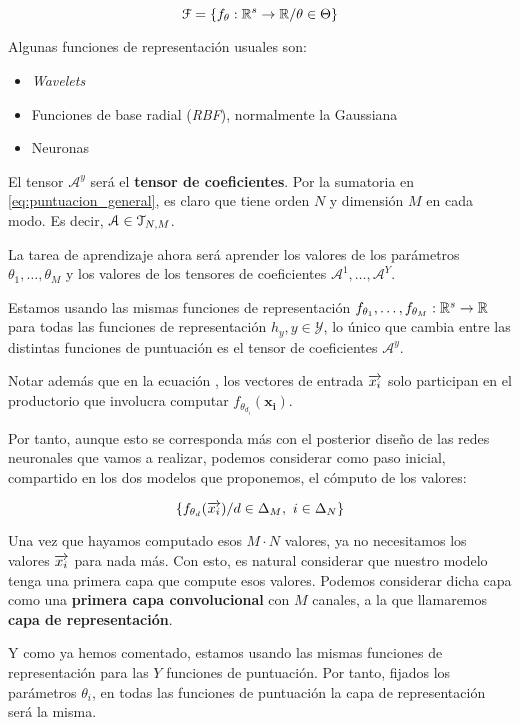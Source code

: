 $$\mathcal{F} = \{ f_{\theta}: \mathbb{R}^s \to \mathbb{R} / \theta \in \Theta \}$$

Algunas funciones de representación usuales son:

\begin{itemize}
    \item \textit{Wavelets}
    \item Funciones de base radial (\textit{RBF}), normalmente la Gaussiana
    \item Neuronas
\end{itemize}

El tensor $\mathcal{A}^y$ será el \textbf{tensor de coeficientes}. Por la sumatoria en \eqref{eq:puntuacion_general}, es claro que tiene orden $N$ y dimensión $M$ en cada modo. Es decir, $\mathcal{A} \in \mathcal{T}_{N, M}$.

La tarea de aprendizaje ahora será aprender los valores de los parámetros $\theta_1, \ldots, \theta_M$ y los valores de los tensores de coeficientes $\mathcal{A}^1, \ldots, \mathcal{A}^Y$.

\begin{observacion}

    Estamos usando las mismas funciones de representación $f_{\theta_1}, \ldots, f_{\theta_M}: \mathbb{R}^s \to \mathbb{R}$ para todas las funciones de representación $h_y, y \in \mathcal{Y}$, lo único que cambia entre las distintas funciones de puntuación es el tensor de coeficientes $\mathcal{A}^y$.


    Notar además que en la ecuación , los vectores de entrada $\overrightarrow{x_i}$ solo participan en el productorio que involucra computar $f_{\theta_{d_i}}(\mathbf{x_i})$.

    Por tanto, aunque esto se corresponda más con el posterior diseño de las redes neuronales que vamos a realizar, podemos considerar como paso inicial, compartido en los dos modelos que proponemos, el cómputo de los valores:

    $$\{f_{\theta_d}(\overrightarrow{x_i}) / d \in \Delta_{M},\ i \in \Delta_{N} \}$$

    Una vez que hayamos computado esos $M \cdot N$ valores, ya no necesitamos los valores $\overrightarrow{x_i}$ para nada más. Con esto, es natural considerar que nuestro modelo tenga una primera capa que compute esos valores. Podemos considerar dicha capa como una \textbf{primera capa convolucional} con $M$ canales, a la que llamaremos \textbf{capa de representación}.

    Y como ya hemos comentado, estamos usando las mismas funciones de representación para las $Y$ funciones de puntuación. Por tanto, fijados los parámetros $\theta_i$, en todas las funciones de puntuación la capa de representación será la misma.
\end{observacion}

